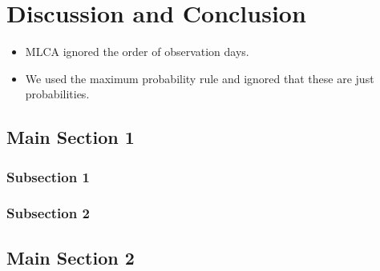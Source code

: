 
\chapter{Discussion and Conclusion} %

\label{Chapter 4} %




\begin{itemize}
	\item MLCA ignored the order of observation days.
	\item We used the maximum probability rule and ignored that these are just probabilities.
\end{itemize}




\section{Main Section 1}


\subsection{Subsection 1}



\subsection{Subsection 2}


\section{Main Section 2}

